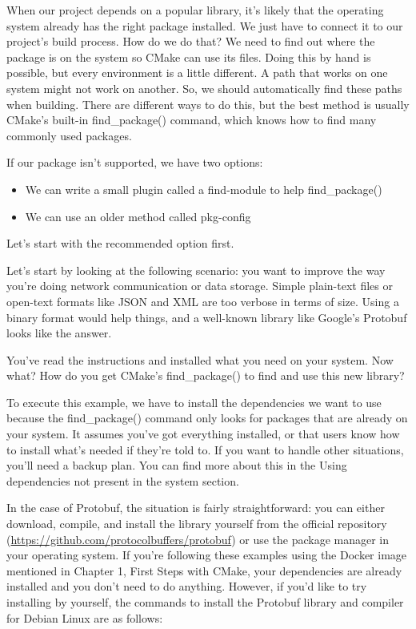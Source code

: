 
When our project depends on a popular library, it’s likely that the operating system already has the right package installed. We just have to connect it to our project’s build process. How do we do that? We need to find out where the package is on the system so CMake can use its files. Doing this by hand is possible, but every environment is a little different. A path that works on one system might not work on another. So, we should automatically find these paths when building. There are different ways to do this, but the best method is usually CMake’s built-in find\_package() command, which knows how to find many commonly used packages.

If our package isn’t supported, we have two options:

\begin{itemize}
\item
We can write a small plugin called a find-module to help find\_package()

\item
We can use an older method called pkg-config
\end{itemize}

Let’s start with the recommended option first.


Let’s start by looking at the following scenario: you want to improve the way you’re doing network communication or data storage. Simple plain-text files or open-text formats like JSON and XML are too verbose in terms of size. Using a binary format would help things, and a well-known library like Google’s Protobuf looks like the answer.

You’ve read the instructions and installed what you need on your system. Now what? How do you get CMake’s find\_package() to find and use this new library?

To execute this example, we have to install the dependencies we want to use because the find\_package() command only looks for packages that are already on your system. It assumes you’ve got everything installed, or that users know how to install what’s needed if they’re told to. If you want to handle other situations, you’ll need a backup plan. You can find more about this in the Using dependencies not present in the system section.

In the case of Protobuf, the situation is fairly straightforward: you can either download, compile, and install the library yourself from the official repository (\url{https://github.com/protocolbuffers/protobuf}) or use the package manager in your operating system. If you’re following these examples using the Docker image mentioned in Chapter 1, First Steps with CMake, your dependencies are already installed and you don’t need to do anything. However, if you’d like to try installing by yourself, the commands to install the Protobuf library and compiler for Debian Linux are as follows:

